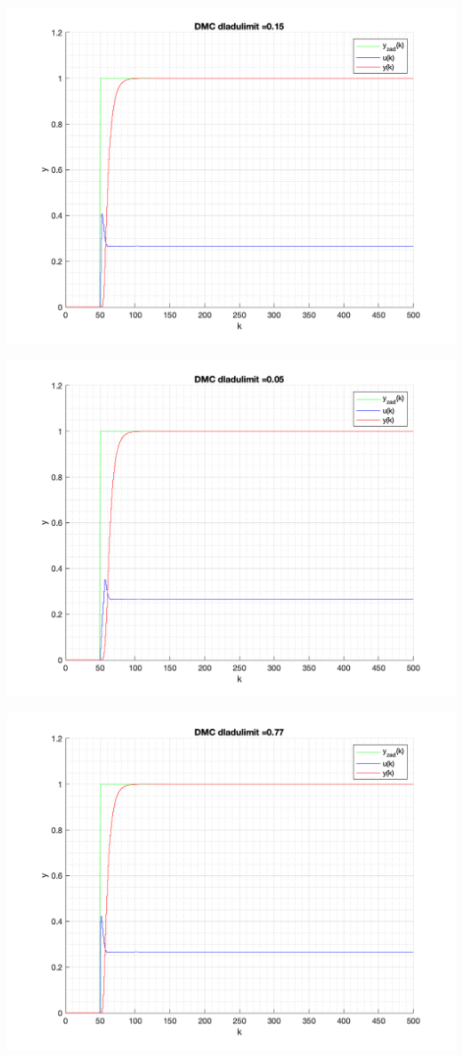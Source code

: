 \documentclass[a4paper, 11pt]{article}
\begin{document}
\begin{enumerate}
 \includegraphics[width=\linewidth]{./ModelsP6_dulimit/P4_DMC_dulimit_0_15_png.png} 
 
 \includegraphics[width=\linewidth]{./ModelsP6_dulimit/P4_DMC_dulimit_0_05_png.png} 
 
 \includegraphics[width=\linewidth]{./ModelsP6_dulimit/P4_DMC_dulimit_0_77_png.png} 
 

\end{enumerate}
\end{document}
